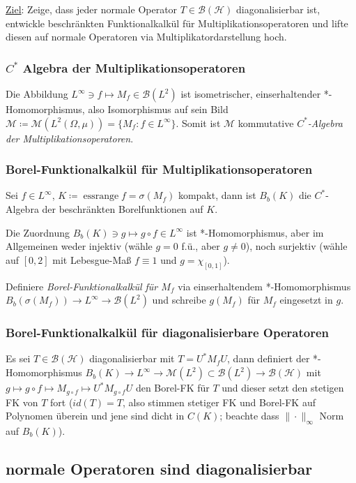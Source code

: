 \documentclass[11pt,a4paper]{scrartcl}
\newcommand{\Hc}{\mathcal{H}}
\newcommand{\B}{\mathcal{B}}
\newcommand{\M}{\mathcal{M}}
\theoremstyle{plain}
\theoremstyle{definition}
\theoremstyle{remark}
\DeclareMathOperator{\essrange}{ess range}
\begin{document}
\underline{Ziel}: Zeige, dass jeder normale Operator $T\in \B(\Hc)$ diagonalisierbar ist, entwickle beschränkten Funktionalkalkül für Multiplikationsoperatoren und lifte diesen auf normale Operatoren via Multiplikatordarstellung hoch.

\subsubsection{$C^*$ Algebra der Multiplikationsoperatoren}

Die Abbildung $L^\infty \ni f \mapsto M_f \in \B(L^2)$ ist isometrischer, einserhaltender *-Homomorphismus, also Isomorphismus auf sein Bild $\M\coloneqq \M(L^2(\Omega,\mu))=\{ M_f: f\in L^\infty \}$. Somit ist $\M$ kommutative \emph{$C^*$-Algebra der Multiplikationsoperatoren}.

\subsubsection{Borel-Funktionalkalkül für Multiplikationsoperatoren}

Sei $f\in L^\infty$, $K\coloneqq \essrange f = \sigma(M_f)$ kompakt, dann ist $B_b(K)$ die $C^*$-Algebra der beschränkten Borelfunktionen auf $K$. 

Die Zuordnung $B_b(K) \ni g \mapsto g\circ f \in L^\infty$ ist *-Homomorphismus, aber im Allgemeinen weder injektiv (wähle $g=0$ f.ü., aber $g\neq 0$), noch surjektiv (wähle auf $[0,2]$ mit Lebesgue-Maß $f\equiv 1$ und $g=\chi_{[0,1]}$).

Definiere \emph{Borel-Funktionalkalkül für $M_f$} via einserhaltendem *-Homomorphismus $B_b(\sigma(M_f)) \to L^\infty \to \B(L^2)$ und schreibe $g(M_f)$ für $M_f$ eingesetzt in $g$. 

\subsubsection{Borel-Funktionalkalkül für diagonalisierbare Operatoren}

Es sei $T\in \B(\Hc)$ diagonalisierbar mit $T=U^*M_f U$, dann definiert der *-Homomorphismus $B_b(K)\to L^\infty \to \M(L^2) \subset \B(L^2) \to \B(\Hc)$ mit $g\mapsto g\circ f \mapsto M_{g\circ f} \mapsto U^* M_{g\circ f} U$ den Borel-FK für $T$ und dieser setzt den stetigen FK von $T$ fort ($id(T)=T$, also stimmen stetiger FK und Borel-FK auf Polynomen überein und jene sind dicht in $C(K)$; beachte dass $\|\cdot\|_\infty$ Norm auf $B_b(K)$).

\subsection{normale Operatoren sind diagonalisierbar}
\end{document}

